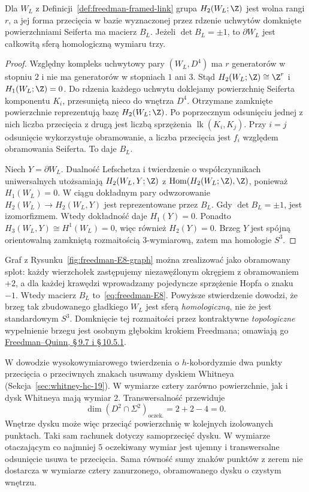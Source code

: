\begin{stwierdzenie}
\label{prop:freedman-link-matrix}
Dla $W_L$ z Definicji~\ref{def:freedman-framed-link}
grupa $H_2(W_L;\Z)$ jest wolna rangi $r$, a jej
forma przecięcia w bazie wyznaczonej przez rdzenie
uchwytów domknięte powierzchniami Seiferta ma macierz $B_L$.
Jeżeli $\det B_L=\pm1$, to $\partial W_L$ jest
całkowitą sferą homologiczną wymiaru trzy.
\end{stwierdzenie}
\begin{proof}
Względny kompleks uchwytowy pary $(W_L,D^4)$ ma
$r$ generatorów w stopniu $2$ i nie ma generatorów
w stopniach $1$ ani $3$. Stąd
$H_2(W_L;\Z)\cong\Z^r$ i $H_1(W_L;\Z)=0$.
Do rdzenia każdego uchwytu doklejamy powierzchnię
Seiferta komponentu $K_i$, przesuniętą nieco do
wnętrza $D^4$. Otrzymane zamknięte powierzchnie
reprezentują bazę $H_2(W_L;\Z)$.
Po poprzecznym odsunięciu jednej z nich liczba
przecięcia z drugą jest liczbą sprzężenia
$\operatorname{lk}(K_i,K_j)$. Przy $i=j$ odsunięcie
wykorzystuje obramowanie, a liczba przecięcia jest
$f_i$ względem obramowania Seiferta. To daje $B_L$.

Niech $Y=\partial W_L$. Dualność Lefschetza i
twierdzenie o współczynnikach uniwersalnych
utożsamiają $H_2(W_L,Y;\Z)$ z
$\operatorname{Hom}(H_2(W_L;\Z),\Z)$, ponieważ
$H_1(W_L)=0$. W ciągu dokładnym pary odwzorowanie
$H_2(W_L)\to H_2(W_L,Y)$ jest reprezentowane przez
$B_L$. Gdy $\det B_L=\pm1$, jest izomorfizmem.
Wtedy dokładność daje $H_1(Y)=0$.
Ponadto $H_3(W_L,Y)\cong H^1(W_L)=0$, więc również
$H_2(Y)=0$. Brzeg $Y$ jest spójną orientowalną
zamkniętą rozmaitością $3$-wymiarową, zatem ma
homologie $S^3$.
\end{proof}

Graf z Rysunku~\ref{fig:freedman-E8-graph} można
zrealizować jako obramowany splot: każdy wierzchołek
zastępujemy niezawęźlonym okręgiem z obramowaniem
$+2$, a dla każdej krawędzi wprowadzamy pojedyncze
sprzężenie Hopfa o znaku $-1$. Wtedy macierz
$B_L$ to~\eqref{eq:freedman-E8}. Powyższe
stwierdzenie dowodzi, że brzeg tak zbudowanego
gładkiego $W_L$ jest sferą \emph{homologiczną},
nie że jest standardowym $S^3$. Domknięcie tej
rozmaitości przez kontraktywne \emph{topologiczne}
wypełnienie brzegu jest osobnym głębokim krokiem
Freedmana; omawiają go
\href{https://archive.mpim-bonn.mpg.de/4789/2/FreedmanQuinn-TopologyOf4Manifolds-Reformatted2013.pdf}
{Freedman--Quinn, \S\,9.7 i \S\,10.5.1}.

W dowodzie wysokowymiarowego twierdzenia o
$h$-kobordyzmie dwa punkty przecięcia o przeciwnych
znakach usuwamy dyskiem Whitneya
(Sekcja~\ref{sec:whitney-hc-19}). W wymiarze cztery
zarówno powierzchnie, jak i dysk Whitneya mają
wymiar $2$. Transwersalność przewiduje
\begin{equation}\label{eq:freedman-whitney-count}
 \dim(D^2\cap\Sigma^2)_{\mathrm{oczek.}}
       =2+2-4=0.
\end{equation}
Wnętrze dysku może więc przeciąć powierzchnię
w kolejnych izolowanych punktach. Taki sam rachunek
dotyczy samoprzecięć dysku. W wymiarze otaczającym
co najmniej $5$ oczekiwany wymiar jest ujemny i
transwersalne odsunięcie usuwa te przecięcia.
Sama równość sumy znaków punktów z zerem nie dostarcza
w wymiarze cztery zanurzonego, obramowanego dysku
o czystym wnętrzu.

